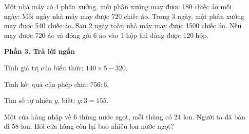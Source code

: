 \begin{ex} %
Một nhà máy có 4 phân xưởng, mỗi phân xưởng may được 180 chiếc áo mỗi ngày:
\choiceTF
{\True Mỗi ngày nhà máy may được 720 chiếc áo.}
{\True Trong 3 ngày, một phân xưởng may được 540 chiếc áo.}
{Sau 2 ngày toàn nhà máy may được 1500 chiếc áo.}
{\True Nếu may được 720 áo và đóng gói 6 áo vào 1 hộp thì đóng được 120 hộp.}
\end{ex}

\textbf{Phần 3. Trả lời ngắn}

\begin{ex} %
Tính giá trị của biểu thức: $140 \times 5 - 320$.
\end{ex}

\begin{ex} %
Tính kết quả của phép chia: $756 : 6$.
\end{ex}

\begin{ex} %
Tìm số tự nhiên $y$, biết: $y : 3 = 155$.
\end{ex}

\begin{ex} %
Một cửa hàng nhập về 6 thùng nước ngọt, mỗi thùng có 24 lon. Người ta đã bán đi 58 lon. Hỏi cửa hàng còn lại bao nhiêu lon nước ngọt?
\end{ex}


